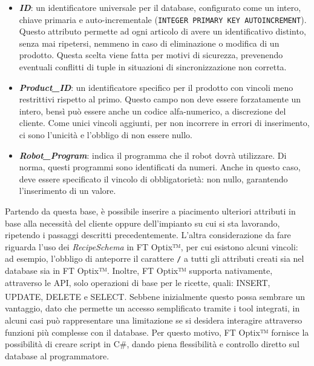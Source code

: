 \begin{itemize}
    \item \textbf{\textit{ID}}: un identificatore universale per il database, configurato come un intero, chiave primaria e auto-incrementale (\verb|INTEGER PRIMARY KEY AUTOINCREMENT|). Questo attributo permette ad ogni articolo di avere un identificativo distinto, senza mai ripetersi, nemmeno in caso di eliminazione o modifica di un prodotto. Questa scelta viene fatta per motivi di sicurezza, prevenendo eventuali conflitti di tuple in situazioni di sincronizzazione non corretta. 
    \item \textbf{\textit{Product\_ID}}: un identificatore specifico per il prodotto con vincoli meno restrittivi rispetto al primo. Questo campo non deve essere forzatamente un intero, bensì può essere anche un codice alfa-numerico, a discrezione del cliente. Come unici vincoli aggiunti, per non incorrere in errori di inserimento, ci sono l'unicità e l'obbligo di non essere nullo. 
    \item \textbf{\textit{Robot\_Program}}: indica il programma che il robot dovrà utilizzare. Di norma, questi programmi sono identificati da numeri. Anche in questo caso, deve essere specificato il vincolo di obbligatorietà: non nullo, garantendo l'inserimento di un valore.
\end{itemize}
Partendo da questa base, è possibile inserire a piacimento ulteriori attributi in base alla necessità del cliente oppure dell'impianto su cui si sta lavorando, ripetendo i passaggi descritti precedentemente. 
L'altra considerazione da fare riguarda l'uso dei \textit{RecipeSchema} in FT Optix™, per cui esistono alcuni vincoli: ad esempio, l'obbligo di anteporre il carattere \verb|/| a tutti gli attributi creati sia nel database sia in FT Optix™. Inoltre, FT Optix™ supporta nativamente, attraverso le API, solo operazioni di base per le ricette, quali: INSERT, UPDATE, DELETE e SELECT\textsuperscript{\cite{rockwelloptixsqlquery}}. Sebbene inizialmente questo possa sembrare un vantaggio, dato che permette un accesso semplificato tramite i tool integrati, in alcuni casi può rappresentare una limitazione se si desidera interagire attraverso funzioni più complesse con il database. Per questo motivo, FT Optix™ fornisce la possibilità di creare script in C\#, dando piena flessibilità e controllo diretto sul database al programmatore. 


